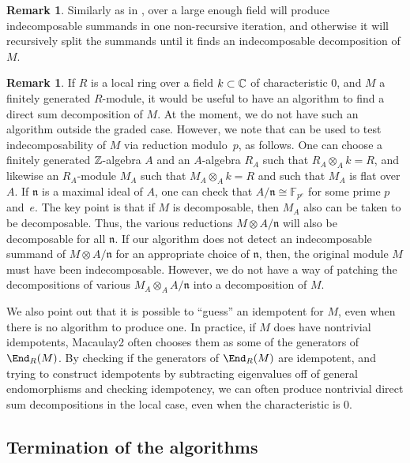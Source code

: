 \documentclass[12pt]{article}
\def\FF{\mathbb F}
\theoremstyle{theorem}
\numberwithin{thm}{section}
\theoremstyle{definition}
\newtheorem{rem}[thm]{Remark}
\def\n{\mathfrak n}
\begin{document}
\begin{rem}\label{rem:local}
  Similarly as in , over a large enough field  will produce indecomposable summands in one non-recursive iteration, and otherwise it will recursively split the summands until it finds an indecomposable decomposition of $M$.
\end{rem}

\begin{rem}\label{rem:char}
  If $R$ is a local ring over a field $k\subset \mathbb C$ of characteristic 0, and $M$ a finitely generated $R$-module, it would be useful to have an algorithm to find a direct sum decomposition of $M$.
  At the moment, we do not have such an algorithm outside the graded case.
  However, we note that  can be used to test indecomposability of $M$ via reduction modulo~$p$, as follows.
  One can choose a finitely generated $\mathbb Z$-algebra $A$ and an $A$-algebra $R_A$ such that $R_A\otimes _A k=R$, and likewise an $R_A$-module $M_A$ such that $M_A\otimes _A k = R$ and such that $M_A$ is flat over $A$. If $\n$ is a maximal ideal of $A$, one can check that $A/\n \cong \FF_{p^e}$ for some prime $p$ and~$e$.
  The key point is that if $M$ is decomposable, then $M_A$ also can be taken to be decomposable. Thus, the various reductions  $M\otimes A/\n$ will also be decomposable for all $\n$.
  If our algorithm does not detect an indecomposable summand of $M\otimes A/\n$ for an appropriate choice of $\n$, then, the original module $M$ must have been indecomposable.
  However,  we do not have a way of patching the decompositions of various $M_A\otimes_A A/\n$ into a decomposition of $M$.

  We also point out that it is possible to ``guess'' an idempotent for $M$, even when there is no algorithm to produce one. In practice, if $M$ does have nontrivial idempotents, Macaulay2 often chooses them as some of the generators of $\End_R(M)$. 
By checking if the generators of $\End_R(M)$ are idempotent, and trying to construct idempotents by subtracting eigenvalues off of general endomorphisms and checking idempotency, we can often produce nontrivial direct sum decompositions in the local case, even when the characteristic is 0.
\end{rem}



\subsection{Termination of the algorithms}
\end{document}

